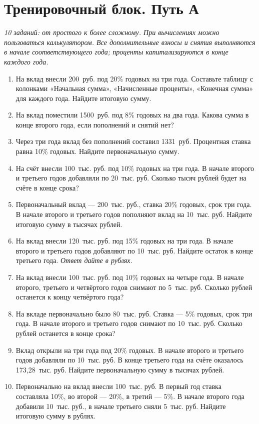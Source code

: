 \documentclass[a4paper,12pt]{article}
\begin{document}
\section*{Тренировочный блок. Путь А}
\textit{10 заданий: от простого к более сложному. При вычислениях можно пользоваться калькулятором. Все дополнительные взносы и снятия выполняются в начале соответствующего года; проценты капитализируются в конце каждого года.}
\begin{enumerate}
\item На вклад внесли 200~руб. под 20\% годовых на три года. Составьте таблицу с колонками «Начальная сумма», «Начисленные проценты», «Конечная сумма» для каждого года. Найдите итоговую сумму.
\item На вклад поместили 1500~руб. под 8\% годовых на два года. Какова сумма в конце второго года, если пополнений и снятий нет?
\item Через три года вклад без пополнений составил 1331~руб. Процентная ставка равна 10\% годовых. Найдите первоначальную сумму.
\item На счёт внесли 100~тыс. руб. под 10\% годовых на три года. В начале второго и третьего годов добавляли по 20~тыс. руб. Сколько тысяч рублей будет на счёте в конце срока?
\item Первоначальный вклад --- 200~тыс. руб., ставка 20\% годовых, срок три года. В начале второго и третьего годов пополняют вклад на 10~тыс. руб. Найдите итоговую сумму в тысячах рублей.
\item На вклад внесли 120~тыс. руб. под 15\% годовых на три года. В начале второго и третьего годов добавляют по 10~тыс. руб. Найдите остаток в конце третьего года. \emph{Ответ дайте в рублях.}
\item На вклад внесли 100~тыс. руб. под 10\% годовых на четыре года. В начале второго, третьего и четвёртого годов снимают по 5~тыс. руб. Сколько рублей останется к концу четвёртого года?
\item На вкладе первоначально было 80~тыс. руб. Ставка --- 5\% годовых, срок три года. В начале второго и третьего годов снимают по 10~тыс. руб. Сколько рублей останется в конце срока?
\item Вклад открыли на три года под 20\% годовых. В начале второго и третьего годов добавляли по 10~тыс. руб. В конце третьего года на счёте оказалось 173{,}28~тыс. руб. Найдите первоначальную сумму в тысячах рублей.
\item Первоначально на вклад внесли 100~тыс. руб. В первый год ставка составляла 10\%, во второй --- 20\%, в третий --- 5\%. В начале второго года добавили 10~тыс. руб., в начале третьего сняли 5~тыс. руб. Найдите итоговую сумму в рублях.
\end{enumerate}
\end{document}
